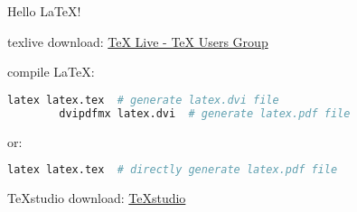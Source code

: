 \documentclass{article}
\begin{document}
    Hello \LaTeX !

    texlive download: \href{https://www.tug.org/texlive/}{TeX Live - TeX Users Group}

    compile \LaTeX :
    \begin{lstlisting}[language=bash]
        latex latex.tex  # generate latex.dvi file
        dvipdfmx latex.dvi  # generate latex.pdf file
    \end{lstlisting}

    or:
    \begin{lstlisting}[language=bash]
        latex latex.tex  # directly generate latex.pdf file
    \end{lstlisting}

    TeXstudio download: \href{https://www.texstudio.org/#download}{TeXstudio}
\end{document}
